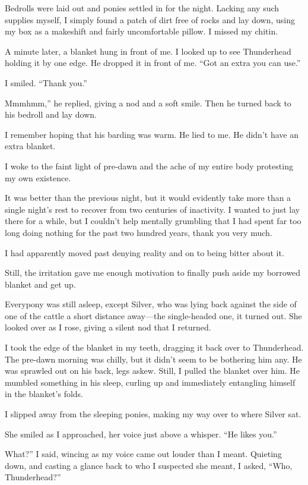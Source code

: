 Bedrolls were laid out and ponies settled in for the night. Lacking any such supplies myself, I simply found a patch of dirt free of rocks and lay down, using my box as a makeshift and fairly uncomfortable pillow. I missed my chitin.

A minute later, a blanket hung in front of me. I looked up to see Thunderhead holding it by one edge. He dropped it in front of me. “Got an extra you can use.”

I smiled. “Thank you.”

\leavevmode{}Mmmhmm,” he replied, giving a nod and a soft smile. Then he turned back to his bedroll and lay down.

I remember hoping that his barding was warm. He lied to me. He didn’t have an extra blanket.

{\br}%
I woke to the faint light of pre-dawn and the ache of my entire body protesting my own existence.

It was better than the previous night, but it would evidently take more than a single night’s rest to recover from two centuries of inactivity. I wanted to just lay there for a while, but I couldn’t help mentally grumbling that I had spent far too long doing nothing for the past two hundred years, thank you very much.

I had apparently moved past denying reality and on to being bitter about it.

Still, the irritation gave me enough motivation to finally push aside my borrowed blanket and get up.

Everypony was still asleep, except Silver, who was lying back against the side of one of the cattle a short distance away—the single-headed one, it turned out. She looked over as I rose, giving a silent nod that I returned.

I took the edge of the blanket in my teeth, dragging it back over to Thunderhead. The pre-dawn morning was chilly, but it didn’t seem to be bothering him any. He was sprawled out on his back, legs askew. Still, I pulled the blanket over him. He mumbled something in his sleep, curling up and immediately entangling himself in the blanket’s folds.

I slipped away from the sleeping ponies, making my way over to where Silver sat.

She smiled as I approached, her voice just above a whisper. “He likes you.”

\leavevmode{}What?” I said, wincing as my voice came out louder than I meant. Quieting down, and casting a glance back to who I suspected she meant, I asked, “Who, Thunderhead?”

